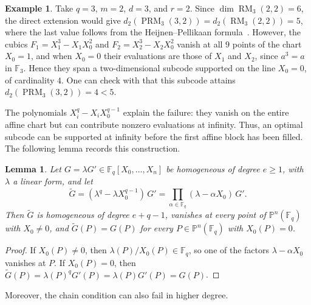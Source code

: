 \documentclass[11pt]{amsart}
\newtheorem{lemma}[theorem]{Lemma}
\theoremstyle{definition}
\newtheorem{example}[theorem]{Example}
\newcommand{\F}{\mathbb F}
\newcommand{\PP}{\mathbb P}
\newcommand{\PRM}{\operatorname{PRM}}
\newcommand{\RM}{\operatorname{RM}}
\numberwithin{equation}{section}
\begin{document}
\begin{example}\label{ex:generaldegree}
Take $q=3$, $m=2$, $d=3$, and $r=2$. Since $\dim\RM_3(2,2)=6$, the
direct extension would give $d_2(\PRM_3(3,2))=d_2(\RM_3(2,2))=5$, where
the last value follows from the Heijnen--Pellikaan formula~\cite{HP}.
However, the cubics $F_1=X_1^3-X_1X_0^2$ and $F_2=X_2^3-X_2X_0^2$ vanish
at all $9$ points of the chart $X_0=1$, and when $X_0=0$ their
evaluations are those of $X_1$ and $X_2$, since $a^3=a$ in $\F_3$. Hence
they span a two-dimensional subcode supported on the line $X_0=0$, of
cardinality $4$. One can check with \cite{sanjoseGHWsPackage,githubGHWs} that this subcode attains $d_2(\PRM_3(3,2))=4<5$.
\end{example}

The polynomials $X_i^q-X_iX_0^{q-1}$ explain the failure: they vanish
on the entire affine chart but can contribute nonzero evaluations
at infinity. Thus, an optimal subcode can be supported at infinity
before the first affine block has been filled. The following lemma
records this construction. 

\begin{lemma}\label{lem:lift}
Let $G=\lambda G'\in\F_q[X_0,\ldots,X_n]$ be homogeneous of degree
$e\ge1$, with $\lambda$ a linear form, and let
\[
 \tilde{G}=(\lambda^q-\lambda X_0^{q-1})\,G'
 =\prod_{\alpha\in\F_q}(\lambda-\alpha X_0)\,G'.
\]
Then $\tilde{G}$ is homogeneous of degree $e+q-1$, vanishes at every
point of $\PP^n(\F_q)$ with $X_0\ne0$, and $\tilde{G}(P)=G(P)$ for
every $P\in\PP^n(\F_q)$ with $X_0(P)=0$.
\end{lemma}

\begin{proof}
If $X_0(P)\ne0$, then $\lambda(P)/X_0(P)\in\F_q$, so one of the factors
$\lambda-\alpha X_0$ vanishes at $P$. If $X_0(P)=0$, then
$\tilde{G}(P)=\lambda(P)^qG'(P)=\lambda(P)G'(P)=G(P)$.
\end{proof}

Moreover, the chain condition can also fail in higher degree.
\end{document}
